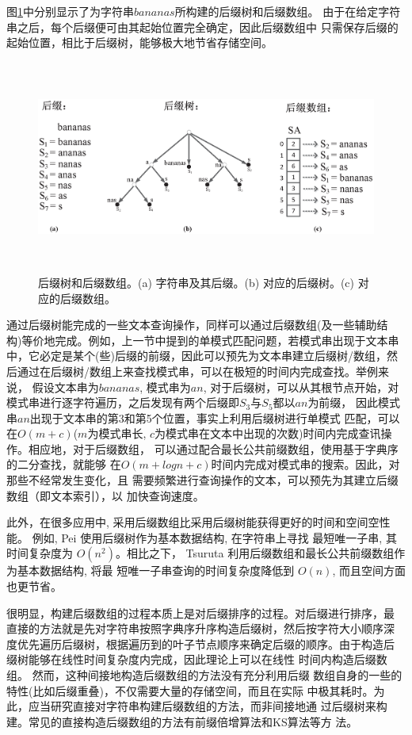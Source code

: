 图\ref{fig:suffix}中分别显示了为字符串$bananas$所构建的后缀树和后缀数组。
由于在给定字符串之后，每个后缀便可由其起始位置完全确定，因此后缀数组中
只需保存后缀的起始位置，相比于后缀树，能够极大地节省存储空间。


\begin{figure}[H]
  \centering
  \includegraphics[height=7cm ,width=15cm]{figures/1_Introduction/Suffix.eps}
  \caption{后缀树和后缀数组。(a) 字符串及其后缀。(b) 对应的后缀树。(c)
    对应的后缀数组。}
  \label{fig:suffix}
\end{figure}

通过后缀树能完成的一些文本查询操作，同样可以通过后缀数组(及一些辅助结
构)等价地完成。例如，上一节中提到的单模式匹配问题，若模式串出现于文本串
中，它必定是某个(些)后缀的前缀，因此可以预先为文本串建立后缀树/数组，然
后通过在后缀树/数组上来查找模式串，可以在极短的时间内完成查找。举例来说，
假设文本串为$bananas$, 模式串为$an$, 对于后缀树，可以从其根节点开始，对
模式串进行逐字符遍历，之后发现有两个后缀即$S_3$与$S_5$都以$an$为前缀，
因此模式串$an$出现于文本串的第3和第5个位置，事实上利用后缀树进行单模式
匹配，可以在$O(m+c)$($m$为模式串长,
$c$为模式串在文本中出现的次数)时间内完成查讯操作。相应地，对于后缀数组，
可以通过配合最长公共前缀数组，使用基于字典序的二分查找，就能够
在$O(m+logn+c)$时间内完成对模式串的搜索。因此，对那些不经常发生变化，且
需要频繁进行查询操作的文本，可以预先为其建立后缀数组（即文本索引），以
加快查询速度。

此外，在很多应用中, 采用后缀数组比采用后缀树能获得更好的时间和空间空性
能。 例如, Pei\cite{Pei2013} 使用后缀树作为基本数据结构, 在字符串上寻找
最短唯一子串, 其时间复杂度为 $O(n^2)$。相比之下， Tsuruta
\cite{Tsuruta2014} 利用后缀数组和最长公共前缀数组作为基本数据结构, 将最
短唯一子串查询的时间复杂度降低到 $O(n)$, 而且空间方面也更节省。

很明显，构建后缀数组的过程本质上是对后缀排序的过程。对后缀进行排序，最
直接的方法就是先对字符串按照字典序升序构造后缀树，然后按字符大小顺序深
度优先遍历后缀树，根据遍历到的叶子节点顺序来确定后缀的顺序。由于构造后
缀树能够在线性时间复杂度内完成\cite{Ukkonen1995}，因此理论上可以在线性
时间内构造后缀数组。 然而，这种间接地构造后缀数组的方法没有充分利用后缀
数组自身的一些的特性(比如后缀重叠)，不仅需要大量的存储空间，而且在实际
中极其耗时。为此，应当研究直接对字符串构建后缀数组的方法，而非间接地通
过后缀树来构建。常见的直接构造后缀数组的方法有前缀倍增算法和KS算法等方
法。

